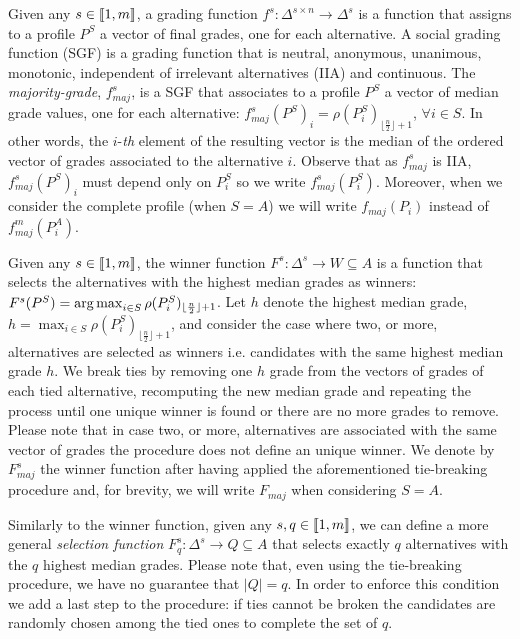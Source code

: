 \documentclass[version=3.21, pagesize, twoside=off, bibliography=totoc, DIV=calc, fontsize=12pt, a4paper]{scrartcl}
\begin{document}
Given any $s \in \llbracket1,m\rrbracket$, a grading function $f^s: \Delta^{s \times n} \rightarrow \Delta^s$ is a function that assigns to a profile $P^S$ a vector of final grades, one for each alternative. A social grading function (SGF) is a grading function that is neutral, anonymous, unanimous, monotonic, independent of irrelevant alternatives (IIA) and continuous. 
The \emph{majority-grade}, $f^s_{maj}$, is a SGF that associates to a profile $P^S$ a vector of median grade values, one for each alternative: $f^s_{maj}(P^S)_i = \rho(P^S_i)_{\lfloor \frac{n}{2} \rfloor + 1}$, $\forall i \in S$. In other words, the $i$-\emph{th} element of the resulting vector is the median of the ordered vector of grades associated to the alternative $i$. Observe that as $f^s_{maj}$ is IIA, $f^s_{maj}(P^S)_i$ must depend only on $P^S_i$ so we write $f^s_{maj}(P^S_i)$. Moreover, when we consider the complete profile (when $S=A$) we will write $f_{maj}(P_i)$ instead of $f^m_{maj}(P^A_i)$.

Given any $s \in \llbracket1,m\rrbracket$, the winner function $F^s:\Delta^{s} \rightarrow W \subseteq A$ is a function that selects the alternatives with the highest median grades as winners: $F^s(P^S) = \operatorname*{arg\,max}_{i\in S}\rho(P^S_i)_{\lfloor \frac{n}{2} \rfloor + 1}$.
Let $h$ denote the highest median grade, $h=\max_{i\in S}\rho(P^S_i)_{\lfloor \frac{n}{2} \rfloor + 1}$, and consider the case where two, or more, alternatives are selected as winners \textemdash i.e. candidates with the same highest median grade $h$. We break ties by removing one $h$ grade from the vectors of grades of each tied alternative, recomputing the new median grade and repeating the process until one unique winner is found or there are no more grades to remove. Please note that in case two, or more, alternatives are associated with the same vector of grades the procedure does not define an unique winner. We denote by $F^s_{maj}$ the winner function after having applied the aforementioned tie-breaking procedure and, for brevity, we will write $F_{maj}$ when considering $S=A$.

Similarly to the winner function, given any $s,q \in \llbracket1,m\rrbracket$, we can define a more general \emph{selection function} $F^s_q:\Delta^{s} \rightarrow Q \subseteq A$ that selects exactly $q$ alternatives with the $q$ highest median grades. Please note that, even using the tie-breaking procedure, we have no guarantee that $|Q|=q$. In order to enforce this condition we add a last step to the procedure: if ties cannot be broken the candidates are randomly chosen among the tied ones to complete the set of $q$. 
\end{document}
